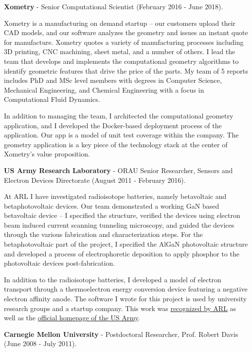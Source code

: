 \textbf{Xometry} - Senior Computational Scientist (February 2016 - June
2018).

Xometry is a manufacturing on demand startup -- our customers upload
their CAD models, and our software analyzes the geometry and issues an
instant quote for manufacture. Xometry quotes a variety of manufacturing
processes including 3D printing, CNC machining, sheet metal, and a
number of others. I lead the team that develops and implements the
computational geometry algorithms to identify geometric features that
drive the price of the parts. My team of 5 reports includes PhD and MSc
level members with degrees in Computer Science, Mechanical Engineering,
and Chemical Engineering with a focus in Computational Fluid Dynamics.

In addition to managing the team, I architected the computational
geometry application, and I developed the Docker-based deployment
process of the application. Our app is a model of unit test coverage
within the company. The geometry application is a key piece of the
technology stack at the center of Xometry's value proposition.

\textbf{US Army Research Laboratory} - ORAU Senior Researcher, Sensors
and Electron Devices Directorate (August 2011 - February 2016).

At ARL I have investigated radioisotope batteries, namely betavoltaic
and betaphotovoltaic devices. Our team demonstrated a working GaN based
betavoltaic device -- I specified the structure, verified the devices
using electron beam induced current scanning tunneling microscopy, and
guided the devices through the various fabrication and characterization
steps. For the betaphotovoltaic part of the project, I specified the
AlGaN photovoltaic structure and developed a process of electrophoretic
deposition to apply phosphor to the photovoltaic devices
post-fabrication.

In addition to the radioisotope batteries, I developed a model of
electron transport through a thermoelectron energy conversion device
featuring a negative electron affinity anode. The software I wrote for
this project is used by university research groups and a startup
company. This work was
\href{http://www.arl.army.mil/www/default.cfm?article=2462}{recognized
by ARL} as well as the
\href{http://www.army.mil/article/123473/Visiting_Army_scientist_makes_discoveries_in_emerging_technology/}{official
homepage of the US Army}.

\textbf{Carnegie Mellon University} - Postdoctoral Researcher, Prof.
Robert Davis (June 2008 - July 2011).

